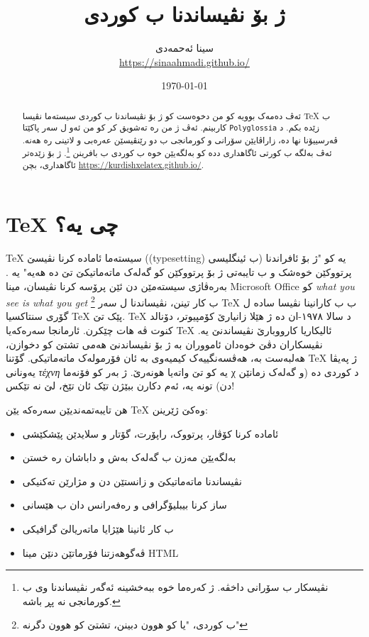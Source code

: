 \documentclass[14pt]{article}
\title{\textenglish{\XeLaTeX} ژ بۆ نڤیساندنا ب کوردی}
\author{سینا ئەحمەدی \\ {\small \url{https://sinaahmadi.github.io/}}}
\date{\today}
\begin{document}
\maketitle
\tableofcontents

\begin{abstract}
ئەڤ دەمەک بوویە کو من دخوەست کو ژ بۆ نڤیساندنا ب کوردی سیستەما نڤیسا 
\textenglish{\TeX}
 ب کاربینم. ئەڤ ژ من رە تەشویق کر کو من ئەو ل سەر پاکێتا 
\texttt{\textenglish{Polyglossia}}
 زێدە بکم. د ڤەرسییۆنا نھا دە، زاراڤایێن سۆرانی و کورمانجی ب دو رێنڤیسێن عەرەبی و لاتینی رە ھەنە. ئەڤ بەلگە ب کورتی ئاگاھداری ددە کو بەلگەیێن خوە ب کوردی ب 
 \textenglish{\XeLaTeX}
   بافرینن \footnote{نڤیسکار ب سۆرانی داخڤە. ژ کەرەما خوە ببەخشینە ئەگەر نڤیساندنا وی ب کورمانجی نە پڕ باشە.}.
   ژ بۆ زێدەتر ئاگاھداری، بچن
   \textenglish{\url{https://kurdishxelatex.github.io/}}.
\end{abstract}



\section{\textenglish{\TeX} چی یە؟}

\textenglish{\TeX}
 سیستەما ئامادە کرنا نڤیسێ ((\textenglish{typesetting})  ب ئینگلیسی) یە کو "ژ بۆ ئافراندنا پرتووکێن خوەشک و ب تایبەتی ژ بۆ پرتووکێن کو گەلەک ماتەماتیکێ تێ دە ھەیە" یە \cite{knuth1984texbook}. بەرەڤاژی سیستەمێن دن ئێن پرۆسە کرنا نڤیسان، مینا 
 \textenglish{Microsoft Office} 
 کو
\textenglish{\textit{what you see is what you get}}
\footnote{ب کوردی، "یا کو ھوون دبینن، تشتێ کو ھوون دگرنە"}
   ب کار تینن، نڤیساندنا ل سەر 
 \textenglish{\TeX}
   ب ب کارانینا نڤیسا سادە ل گۆری سنتاکسیا 
 \textenglish{\TeX}
    پێک تێ.
 \textenglish{\TeX} 
     د سالا ١٩٧٨-ان دە ژ ھێلا زانیارێ کۆمپیوتر، دۆنالد کنوت ڤە ھات چێکرن. ئارمانجا سەرەکەیا 
 \textenglish{\TeX}
      ئالیکاریا کارووبارێ نڤیساندنێ یە. نڤیسکاران دڤێ خوەدان ئامووران بە ژ بۆ نڤیساندنێ ھەمی تشتێ کو دخوازن، ھەلبەست بە، ھەڤسەنگییەک کیمیەوی بە ئان فۆرمولەک ماتەماتیکی. گۆتنا 
 \textenglish{\TeX} 
       ژ پەیڤا یەونانی
 \textgreek{\textit{τέχνη}} 
       یە کو تێ واتەیا ھونەرێ. ژ بەر کو فۆنەما
 \textgreek{χ} 
       د کوردی دە (و گەلەک زمانێن دن) تونە یە، ئەم دکارن ببێژن تێک ئان تێخ، لێ نە تێکس!


ھن تایبەتمەندیێن سەرەکە یێن 
 \textenglish{\TeX}
  وەکێ ژێرینن:
\begin{itemize}
\item   ئامادە کرنا کۆڤار، پرتووک، راپۆرت، گۆتار و سلایدێن پێشکێشی
\item   بەلگەیێن مەزن ب گەلەک بەش و داباشان رە خستن
\item   نڤیساندنا ماتەماتیکێ و زانستێن دن و مژارێن تەکنیکی
\item   ساز کرنا بیبلیۆگرافی و رەفەرانس دان ب ھێسانی
\item   ب کار ئانینا ھێژایا ماتەریالێ گرافیکی
\item   ڤەگوھەزتنا فۆرماتێن دنێن مینا HTML
\end{itemize}
\end{document}
